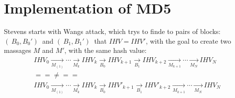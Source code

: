 \chapter{Implementation of MD5}
\label{chapter:kap2}
Stevens starts with Wangs attack, which trys to finde to pairs of blocks:
\( (\ B_0 , B_0' )\ \)  and \( (\ B_1 , B_1' )\ \) that \( IHV = IHV' \),
 with the goal to create two massages $ M $ and $ M' $, with the same hash value:\\

\begin{gather*}
     IHV_0 \xrightarrow[M_{(1)}] {} \cdots \xrightarrow[M_k]{}  IHV_k \xrightarrow[B_0]{}  IHV_{k + 1} \xrightarrow[B_1]{}  IHV_{k + 2} \xrightarrow[M_{k+1}]{} \cdots \xrightarrow[M_N]{}  IHV_N     \\
    =  =  \ne  =  = \\
     IHV_0 \xrightarrow[M_{(1)}] {} \cdots \xrightarrow[M_k]{}  IHV_k \xrightarrow[B_0]{}  IHV'_{k + 1} \xrightarrow[B_1]{}  IHV'_{k + 2} \xrightarrow[M_{k+1}]{} \cdots \xrightarrow[M_N]{} IHV_N   \\
\end{gather*} 